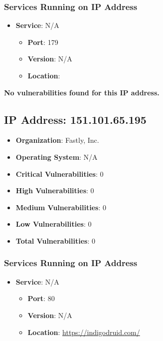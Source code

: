 \documentclass{article}
\begin{document}
\subsubsection*{Services Running on IP Address}

\begin{itemize}
    
        \item \textbf{Service}: N/A
        \begin{itemize}
            \item \textbf{Port}: 179
            \item \textbf{Version}:  N/A 
            \item \textbf{Location}: \href{  }{  }
        \end{itemize}
    
\end{itemize}


\textbf{No vulnerabilities found for this IP address.}




\clearpage



\subsection{IP Address: 151.101.65.195}

\begin{itemize}
    \item \textbf{Organization}: Fastly, Inc.
    \item \textbf{Operating System}:  N/A 
    \item \textbf{Critical Vulnerabilities}: 0
    \item \textbf{High Vulnerabilities}: 0
    \item \textbf{Medium Vulnerabilities}: 0
    \item \textbf{Low Vulnerabilities}: 0
    \item \textbf{Total Vulnerabilities}: 0
\end{itemize}

\subsubsection*{Services Running on IP Address}

\begin{itemize}
    
        \item \textbf{Service}: N/A
        \begin{itemize}
            \item \textbf{Port}: 80
            \item \textbf{Version}:  N/A 
            \item \textbf{Location}: \href{ https://indigodruid.com/ }{ https://indigodruid.com/ }
        \end{itemize}
    
\end{itemize}
\end{document}
